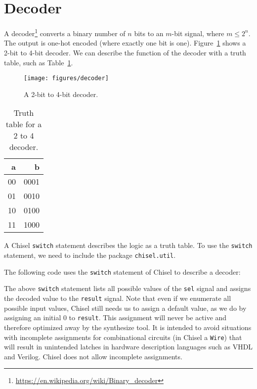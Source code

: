 \documentclass[%
    10pt,
    headinclude, footexclude,
    openright, %
    notitlepage,
    cleardoubleempty,
    headsepline,
    pointlessnumbers,
    bibtotoc, idxtotoc,
    ]{scrbook}
\newcommand{\scale}{0.7}
\newcommand{\code}[1]{{\lstinline[basicstyle=\small\ttfamily]{#1}}}
\newcommand{\myref}[2]{\href{#1}{#2}}
\renewcommand{\myref}[2]{{#2}{\footnote{\url{#1}}}}
\begin{document}
\section{Decoder}

A \myref{https://en.wikipedia.org/wiki/Binary_decoder}{decoder}
converts a binary number of $n$ bits to an $m$-bit signal, where $m \leq 2^n$.
The output is one-hot encoded (where exactly one bit is one).
Figure~\ref{fig:decoder} shows a 2-bit to 4-bit decoder. We can describe the function
of the decoder with a truth table, such as Table~\ref{tab:decoder}.

\begin{figure}
  \centering
  \texttt{[image: figures/decoder]}
  \caption{A 2-bit to 4-bit decoder.}
  \label{fig:decoder}
\end{figure}


\begin{table}
 \centering
  \begin{tabular}{rr}
    \toprule
    a & b \\
    \midrule
    00 & 0001 \\
    01 & 0010 \\
    10 & 0100 \\
    11 & 1000 \\
    \bottomrule
  \end{tabular}
  \caption{Truth table for a 2 to 4 decoder.}
 \label{tab:decoder}
\end{table}

A Chisel \code{switch} statement describes the logic as a truth table.
To use the \code{switch} statement, we need to include the package \code{chisel.util}.



\noindent The following code uses the \code{switch} statement of Chisel to describe a decoder:



\noindent The above \code{switch} statement lists all possible values of the \code{sel} signal
and assigns the decoded value to the \code{result} signal.
Note that even if we enumerate all possible input values, Chisel still needs us to assign a
default value, as we do by assigning an initial 0 to \code{result}.
This assignment will never be active and therefore optimized away by the synthesize tool.
It is intended to avoid situations with incomplete assignments for combinational circuits
(in Chisel a \code{Wire}) that will result in unintended latches in hardware description
languages such as VHDL and Verilog. Chisel does not allow incomplete assignments.
\end{document}
